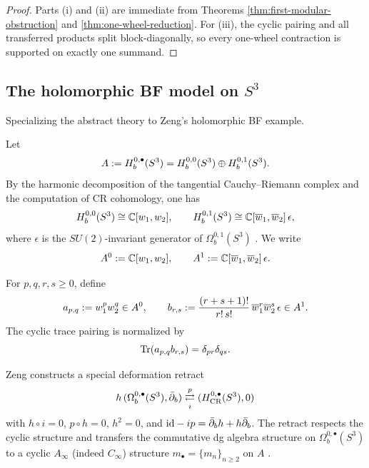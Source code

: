 \begin{proof}
Parts \textup{(i)} and \textup{(ii)} are immediate from Theorems
\ref{thm:first-modular-obstruction} and \ref{thm:one-wheel-reduction}. For
\textup{(iii)}, the cyclic pairing and all transferred products split block-diagonally, so every
one-wheel contraction is supported on exactly one summand.
\end{proof}

\subsection{The holomorphic BF model on $S^3$}

Specializing the abstract theory to Zeng's holomorphic BF example.

\begin{definition}
Let
\[
A:=H_b^{0,\bullet}(S^3) = H_b^{0,0}(S^3)\oplus H_b^{0,1}(S^3).
\]
By the harmonic decomposition of the tangential Cauchy--Riemann complex and the computation
of CR cohomology, one has
\[
H_b^{0,0}(S^3)\cong \mathbb C[w_1,w_2],
\qquad
H_b^{0,1}(S^3)\cong \mathbb C[\overline{w}_1,\overline{w}_2]\,\epsilon,
\]
where $\epsilon$ is the $SU(2)$-invariant generator of $\Omega_b^{0,1}(S^3)$
\cite{ZengTwistedHolography}. We write
\[
A^0:=\mathbb C[w_1,w_2],
\qquad
A^1:=\mathbb C[\overline{w}_1,\overline{w}_2]\,\epsilon.
\]
\end{definition}

\begin{definition}
For $p,q,r,s\ge 0$, define
\[
a_{p,q}:=w_1^p w_2^q\in A^0,
\qquad
b_{r,s}:=\frac{(r+s+1)!}{r!\,s!}\,\overline{w}_1^r\overline{w}_2^s\,\epsilon\in A^1.
\]
The cyclic trace pairing is normalized by
\[
\operatorname{Tr}(a_{p,q}b_{r,s})=\delta_{pr}\delta_{qs}.
\]
\end{definition}

\begin{remark}
Zeng constructs a special deformation retract
\[
h\,(\Omega_b^{0,\bullet}(S^3),\bar\partial_b)
\underset{i}{\overset{p}{\rightleftarrows}}
(H_{\mathrm{CR}}^{0,\bullet}(S^3),0)
\]
with $h\circ i=0$, $p\circ h=0$, $h^2=0$, and $\mathrm{id}-ip=\bar\partial_b h+h\bar\partial_b$.
The retract respects the cyclic structure and transfers the
commutative dg algebra structure on $\Omega_b^{0,\bullet}(S^3)$ to a cyclic $A_\infty$ (indeed
$C_\infty$) structure $m_\bullet=\{m_n\}_{n\ge 2}$ on $A$ \cite{ZengTwistedHolography}.
\end{remark}

